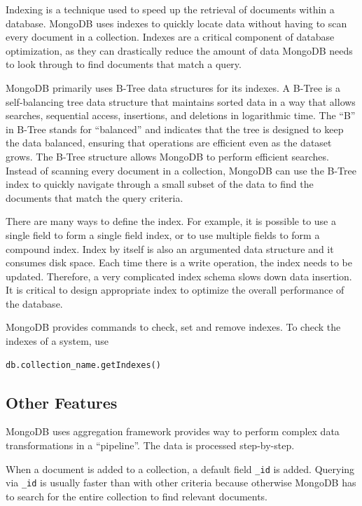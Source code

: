 Indexing is a technique used to speed up the retrieval of documents within a database. MongoDB uses indexes to quickly locate data without having to scan every document in a collection. Indexes are a critical component of database optimization, as they can drastically reduce the amount of data MongoDB needs to look through to find documents that match a query.

MongoDB primarily uses B-Tree data structures for its indexes. A B-Tree is a self-balancing tree data structure that maintains sorted data in a way that allows searches, sequential access, insertions, and deletions in logarithmic time. The ``B'' in B-Tree stands for ``balanced'' and indicates that the tree is designed to keep the data balanced, ensuring that operations are efficient even as the dataset grows. The B-Tree structure allows MongoDB to perform efficient searches. Instead of scanning every document in a collection, MongoDB can use the B-Tree index to quickly navigate through a small subset of the data to find the documents that match the query criteria.

There are many ways to define the index. For example, it is possible to use a single field to form a single field index, or to use multiple fields to form a compound index. Index by itself is also an argumented data structure and it consumes disk space. Each time there is a write operation, the index needs to be updated. Therefore, a very complicated index schema slows down data insertion. It is critical to design appropriate index to optimize the overall performance of the database.

MongoDB provides commands to check, set and remove indexes. To check the indexes of a system, use
\begin{lstlisting}
db.collection_name.getIndexes()
\end{lstlisting}

\subsection{Other Features}

MongoDB uses aggregation framework provides way to perform complex data transformations in a ``pipeline''. The data is processed step-by-step.

When a document is added to a collection, a default field \verb|_id| is added. Querying via \verb|_id| is usually faster than with other criteria because otherwise MongoDB has to search for the entire collection to find relevant documents. 

